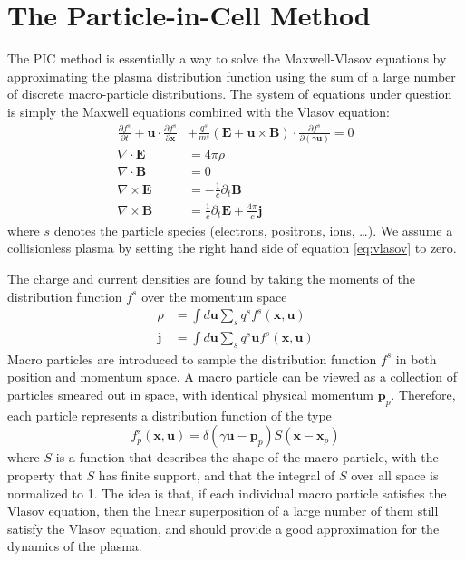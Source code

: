 \section{The Particle-in-Cell Method}
\label{sec:particle-cell-method}
The PIC method is essentially a way to solve the Maxwell-Vlasov
equations by approximating the plasma distribution function using the
sum of a large number of discrete macro-particle distributions. The
system of equations under question is simply the Maxwell equations
combined with the Vlasov equation:
\begin{align}
    \frac{\partial f^{s}}{\partial t} + \mathbf{u}\cdot\frac{\partial f^s}{\partial \mathbf{x}} &+ \frac{q^s}{m^s}(\mathbf{E} + \mathbf{u}\times \mathbf{B})\cdot\frac{\partial f^s}{\partial (\gamma \mathbf{u})} = 0 \label{eq:vlasov}\\
    \nabla\cdot \mathbf{E} &= 4\pi\rho \\
    \nabla\cdot \mathbf{B} &= 0 \\
    \nabla\times \mathbf{E} &= -\frac{1}{c}\partial_t \mathbf{B} \\
    \nabla\times \mathbf{B} &= \frac{1}{c}\partial_t \mathbf{E} + \frac{4\pi}{c} \mathbf{j}
\end{align}
where $s$ denotes the particle species (electrons, positrons, ions,
\dots). We assume a collisionless plasma by setting the right hand
side of equation \eqref{eq:vlasov} to zero.

The charge and current densities are found by taking the moments of
the distribution function $f^s$ over the momentum space
\begin{align}
  \rho &= \int d \mathbf{u} \sum_s q^s f^s(\mathbf{x}, \mathbf{u}) \label{eqn:rho} \\
  \mathbf{j} &= \int d \mathbf{u} \sum_s q^s \mathbf{u} f^s(\mathbf{x}, \mathbf{u}) \label{eqn:j}
\end{align}
Macro particles are introduced to sample the distribution function
$f^s$ in both position and momentum space. A macro particle can be
viewed as a collection of particles smeared out in space, with
identical physical momentum $\mathbf{p}_{p}$. Therefore, each
particle represents a distribution function of the type
\begin{equation}
    \label{eq:single-particle}
    f^s_{p}(\mathbf{x}, \mathbf{u}) = \delta(\gamma \mathbf{u} - \mathbf{p}_{p}) S(\mathbf{x} - \mathbf{x}_{p})
\end{equation}
where $S$ is a function that describes the shape of the macro
particle, with the property that $S$ has finite support, and that the
integral of $S$ over all space is normalized to 1. The idea is that,
if each individual macro particle satisfies the Vlasov equation, then
the linear superposition of a large number of them still satisfy the
Vlasov equation, and should provide a good approximation for the
dynamics of the plasma.

